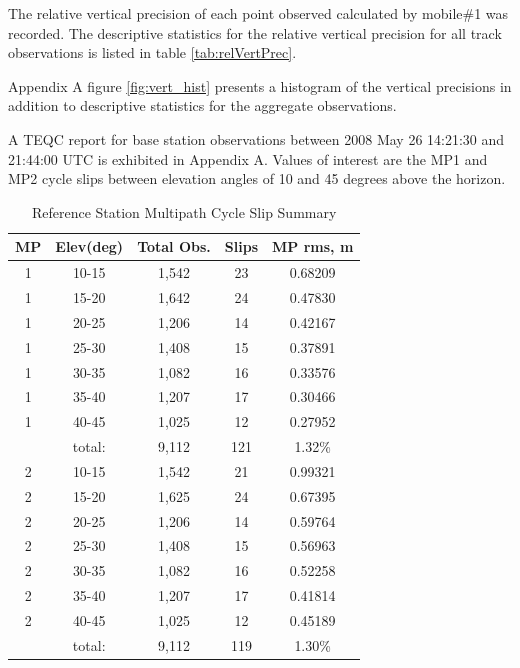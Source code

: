 The relative vertical precision of each point observed calculated by mobile\#1 was recorded. The descriptive statistics for the relative vertical precision for all track observations is listed in table \ref{tab:relVertPrec}.

Appendix A figure \ref{fig:vert_hist} presents a histogram of the vertical precisions in addition to descriptive statistics for the aggregate observations.

A TEQC report for base station observations between 2008 May 26 14:21:30 and 21:44:00 UTC is exhibited in Appendix A. Values of interest are the MP1 and MP2 cycle slips between elevation angles of 10 and 45 degrees above the horizon.

\begin{table}[ht]
	\begin{center}
	\caption{Reference Station Multipath Cycle Slip Summary}
	\label{tab:teqcMP}
	\begin{tabular}{c c c c c}
	\toprule
	MP & Elev(deg) & Total Obs. & Slips & MP rms, m \\
	\midrule
	1 & 10-15 & 1,542 & 23 & 0.68209\\
	1 & 15-20 & 1,642 & 24 & 0.47830\\
	1 & 20-25 & 1,206 & 14 & 0.42167\\
	1 & 25-30 & 1,408 & 15 & 0.37891\\
	1 & 30-35 & 1,082 & 16 & 0.33576\\
	1 & 35-40 & 1,207 & 17 & 0.30466\\
	1 & 40-45 & 1,025 & 12 & 0.27952\\
	   & total:  &  9,112 & 121 & 1.32\% \\
	2 & 10-15 & 1,542 & 21 & 0.99321\\
	2 & 15-20 & 1,625 & 24 & 0.67395\\
	2 & 20-25 & 1,206 & 14 & 0.59764\\
	2 & 25-30 & 1,408 & 15 & 0.56963\\
	2 & 30-35 & 1,082 & 16 & 0.52258\\
	2 & 35-40 & 1,207 & 17 & 0.41814\\
	2 & 40-45 & 1,025 & 12 & 0.45189\\
	   & total:  & 9,112  & 119 & 1.30\% \\
	\bottomrule
	\end{tabular}
	\end{center}
\end{table}

